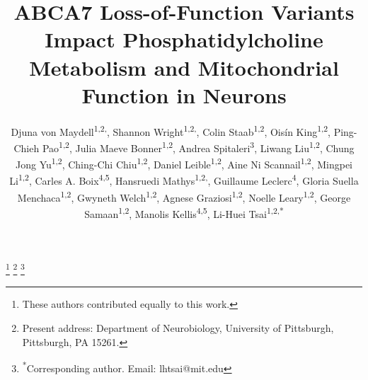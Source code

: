 \title{ABCA7 Loss-of-Function Variants Impact Phosphatidylcholine Metabolism and Mitochondrial Function in Neurons}

\author{%
  \parbox{\textwidth}{%
    Djuna von Maydell\textsuperscript{1,2,\textdagger}, 
    Shannon Wright\textsuperscript{1,2,\textdagger}, 
    Colin Staab\textsuperscript{1,2}, 
    Ois\'{i}n King\textsuperscript{1,2}, 
    Ping-Chieh Pao\textsuperscript{1,2}, 
    Julia Maeve Bonner\textsuperscript{1,2}, 
    Andrea Spitaleri\textsuperscript{3}, 
    Liwang Liu\textsuperscript{1,2}, 
    Chung Jong Yu\textsuperscript{1,2}, 
    Ching-Chi Chiu\textsuperscript{1,2}, 
    Daniel Leible\textsuperscript{1,2}, 
    Aine Ni Scannail\textsuperscript{1,2}, 
    Mingpei Li\textsuperscript{1,2}, 
    Carles A. Boix\textsuperscript{4,5}, 
    Hansruedi Mathys\textsuperscript{1,2,\textdaggerdbl}, 
    Guillaume Leclerc\textsuperscript{4}, 
    Gloria Suella Menchaca\textsuperscript{1,2}, 
    Gwyneth Welch\textsuperscript{1,2}, 
    Agnese Graziosi\textsuperscript{1,2}, 
    Noelle Leary\textsuperscript{1,2}, 
    George Samaan\textsuperscript{1,2}, 
    Manolis Kellis\textsuperscript{4,5}, 
    Li-Huei Tsai\textsuperscript{1,2,*}
  }%
}

\date{}
\maketitle


\thanks{\textsuperscript{\textdagger}These authors contributed equally to this work.}
\thanks{\textsuperscript{\textdaggerdbl}Present address: Department of Neurobiology, University of Pittsburgh, Pittsburgh, PA 15261.}
\thanks{\textsuperscript{*}Corresponding author. Email: lhtsai@mit.edu}



 